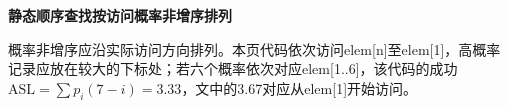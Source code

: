 {\color{ink}\bfseries 静态顺序查找按访问概率非增序排列}\par\vspace{1bp}概率非增序应沿实际访问方向排列。本页代码依次访问elem[n]至elem[1]，高概率记录应放在较大的下标处；若六个概率依次对应elem[1..6]，该代码的成功\(\mathrm{ASL}=\allowbreak{}\sum p_{i}(7-i)=\allowbreak{}3.33\)，文中的3.67对应从elem[1]开始访问。
